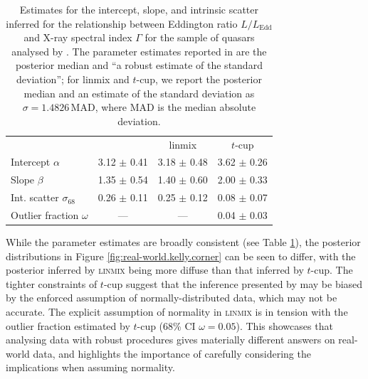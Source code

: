 \documentclass[fleqn,usenatbib]{rasti}
\begin{document}
\begin{table}
	\centering
	\caption{Estimates for the intercept, slope, and intrinsic scatter inferred for
	the relationship between Eddington ratio $L / L_{\text{Edd}}$ and X-ray
	spectral index $\Gamma$ for the sample of quasars analysed by
	\citet{Kelly:2007}. The parameter estimates reported in \citet{Kelly:2007} are
	the posterior median and ``a robust estimate of the standard deviation''; for
	linmix and $t$-cup, we report the posterior median and an estimate of the
	standard deviation as $\sigma = 1.4826 \, \text{MAD}$, where MAD is the median
	absolute deviation.}
	\label{tab:real-world.kelly.params}
	\begin{tabular}{lccc} %
                               & \citet{Kelly:2007} & linmix   & $t$-cup       \\
    Intercept $\alpha$         & 3.12 $\pm$ 0.41 & 3.18 $\pm$ 0.48 & 3.62 $\pm$ 0.26 \\
    Slope $\beta$              & 1.35 $\pm$ 0.54 & 1.40 $\pm$ 0.60 & 2.00 $\pm$ 0.33 \\
    Int. scatter $\sigma_{68}$ & 0.26 $\pm$ 0.11 & 0.25 $\pm$ 0.12 & 0.08 $\pm$ 0.07 \\
    Outlier fraction $\omega$  &      ---      &      ---      & 0.04 $\pm$ 0.03 \\
\end{tabular}
\end{table}

While the parameter estimates are broadly consistent (see Table
\ref{tab:real-world.kelly.params}), the posterior distributions in Figure
\ref{fig:real-world.kelly.corner} can be seen to differ, with the posterior
inferred by \textsc{linmix} being more diffuse than that inferred by $t$-cup.
The tighter constraints of $t$-cup suggest that the inference presented by
\citet{Kelly:2007} may be biased by the enforced assumption of normally-distributed data,
which may not be accurate.
The explicit assumption of normality in \textsc{linmix} is in tension with the
outlier fraction estimated by $t$-cup (68\% CI $\omega =
0.05$). This showcases that analysing
data with robust procedures gives materially different answers on real-world
data, and highlights the importance of carefully considering the implications
when assuming normality.
\end{document}
